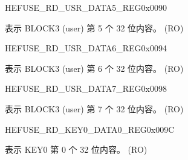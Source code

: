 \begin{register}{H}{EFUSE\_RD\_USR\_DATA5\_REG}{0x0090}\label{regdesc:EFUSERDUSRDATA5REG}
%
\regnewline%
\begin{regdesc}\begin{reglist}
\label{fielddesc:EFUSEUSRDATA5}\item [EFUSE\_USR\_DATA5] 表示 BLOCK3 (user) 第 5 个 32 位内容。 (RO)
\end{reglist}\end{regdesc}
\end{register}


\begin{register}{H}{EFUSE\_RD\_USR\_DATA6\_REG}{0x0094}\label{regdesc:EFUSERDUSRDATA6REG}
%
\regnewline%
\begin{regdesc}\begin{reglist}
\label{fielddesc:EFUSEUSRDATA6}\item [EFUSE\_USR\_DATA6] 表示 BLOCK3 (user) 第 6 个 32 位内容。 (RO)
\end{reglist}\end{regdesc}
\end{register}


\begin{register}{H}{EFUSE\_RD\_USR\_DATA7\_REG}{0x0098}\label{regdesc:EFUSERDUSRDATA7REG}
%
\regnewline%
\begin{regdesc}\begin{reglist}
\label{fielddesc:EFUSEUSRDATA7}\item [EFUSE\_USR\_DATA7] 表示 BLOCK3 (user) 第 7 个 32 位内容。 (RO)
\end{reglist}\end{regdesc}
\end{register}


\begin{register}{H}{EFUSE\_RD\_KEY0\_DATA0\_REG}{0x009C}\label{regdesc:EFUSERDKEY0DATA0REG}
%
\regnewline%
\begin{regdesc}\begin{reglist}
\label{fielddesc:EFUSEKEY0DATA0}\item [EFUSE\_KEY0\_DATA0] 表示 KEY0 第 0 个 32 位内容。 (RO)
\end{reglist}\end{regdesc}
\end{register}


